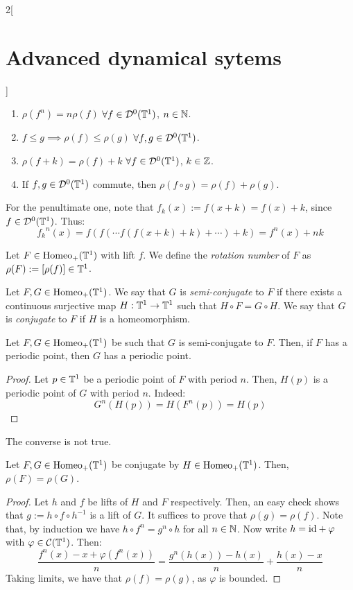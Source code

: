 \documentclass[../../../main_math.tex]{subfiles}
\begin{document}
\begin{multicols}{2}[\section{Advanced dynamical sytems}]
\begin{proposition}
\begin{enumerate}
      \item $\rho(f^n)=n\rho(f)$ $\forall f\in \mathcal{D}^0(\mathbb{T}^1)$, $n\in\mathbb{N}$.
      \item $f\leq g\implies \rho(f)\leq \rho(g)$ $\forall f,g\in \mathcal{D}^0(\mathbb{T}^1)$.
      \item $\rho(f+k)=\rho(f) + k$ $\forall f\in \mathcal{D}^0(\mathbb{T}^1)$, $k\in\mathbb{Z}$.
      \item If $f,g\in \mathcal{D}^0(\mathbb{T}^1)$ commute, then $\rho(f\circ g)=\rho(f)+\rho(g)$.
    \end{enumerate}
  \end{proposition}
  \begin{sproof}
    For the penultimate one, note that $f_k(x):=f(x+k)=f(x)+k$, since $f\in \mathcal{D}^0(\mathbb{T}^1)$. Thus:
    $$
      {f_k}^n(x)=f(f(\cdots f(f(x+k)+k)+\cdots )+k)=f^n(x)+nk
    $$
  \end{sproof}
  \begin{definition}
    Let $F\in \mathrm{Homeo}_+(\mathbb{T}^1)$ with lift $f$. We define the \emph{rotation number} of $F$ as $\rho(F):=[\rho(f)]\in \mathbb{T}^1$.
  \end{definition}
  \begin{definition}
    Let $F,G\in\mathrm{Homeo}_+(\mathbb{T}^1)$. We say that $G$ is \emph{semi-conjugate} to $F$ if there exists a continuous surjective map $H:\mathbb{T}^1\to \mathbb{T}^1$ such that $H\circ F=G\circ H$. We say that $G$ is \emph{conjugate} to $F$ if $H$ is a homeomorphism.
  \end{definition}
  \begin{lemma}
    Let $F,G\in\mathrm{Homeo}_+(\mathbb{T}^1)$ be such that $G$ is semi-conjugate to $F$. Then, if $F$ has a periodic point, then $G$ has a periodic point.
  \end{lemma}
  \begin{proof}
    Let $p\in \mathbb{T}^1$ be a periodic point of $F$ with period $n$. Then, $H(p)$ is a periodic point of $G$ with period $n$. Indeed:
    $$
      G^n(H(p))=H(F^n(p))=H(p)
    $$
  \end{proof}
  \begin{remark}
    The converse is not true.
  \end{remark}
  \begin{theorem}
    Let $F,G\in\mathrm{Homeo}_+(\mathbb{T}^1)$ be conjugate by $H\in \mathrm{Homeo}_+(\mathbb{T}^1)$. Then, $\rho(F)=\rho(G)$.
  \end{theorem}
  \begin{proof}
    Let $h$ and $f$ be lifts of $H$ and $F$ respectively. Then, an easy check shows that $g:=h\circ f\circ h^{-1}$ is a lift of $G$. It suffices to prove that $\rho(g)=\rho(f)$. Note that, by induction we have $h\circ f^n=g^n\circ h$ for all $n\in\mathbb{N}$. Now write $h=\mathrm{id} + \varphi$ with $\varphi\in \mathcal{C}(\mathbb{T}^1)$. Then:
    \begin{equation*}
      \frac{f^n(x)-x+\varphi(f^n(x))}{n}= \frac{g^n(h(x))-h(x)}{n}+\frac{h(x)-x}{n}
    \end{equation*}
    Taking limits, we have that $\rho(f)=\rho(g)$, as $\varphi$ is bounded.
  \end{proof}

\end{multicols}
\end{document}
